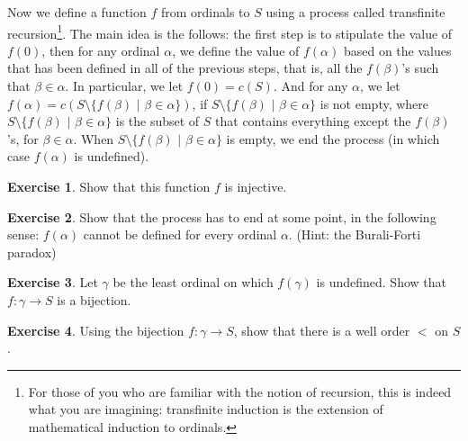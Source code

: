\documentclass[11pt]{article}
\theoremstyle{definition}
\newtheorem{exer}{Exercise}
\begin{document}
\noindent
Now we define a function $f$ from ordinals to $S$ using a process called transfinite recursion\footnote{For those of you who are familiar with the notion of recursion, this is indeed what you are imagining: transfinite induction is the extension of mathematical induction to ordinals.}. The main idea is the follows: the first step is to stipulate the value of $f(0)$, then for any ordinal $\alpha$, we define the value of $f(\alpha)$ based on the values that has been defined in all of the previous steps, that is, all the $f(\beta)$'s such that $\beta \in \alpha$. In particular, we let $f(0) = c(S)$. And for any $\alpha$, we let $f(\alpha) = c(S \setminus \{f(\beta) \, \, | \, \, \beta \in \alpha \})$, if $S \setminus \{f(\beta) \, \, | \, \, \beta \in \alpha \}$ is not empty, where $S \setminus \{f(\beta) \, \, | \, \, \beta \in \alpha \}$ is the subset of $S$ that contains everything except the $f(\beta)$'s, for $\beta \in \alpha$. When $S \setminus \{f(\beta) \, \, | \, \, \beta \in \alpha \}$ is empty, we end the process (in which case $f(\alpha)$ is undefined).

\begin{exer}
Show that this function $f$ is injective.
\end{exer}

\begin{exer}
Show that the process has to end at some point, in the following sense: $f(\alpha)$ cannot be defined for every ordinal $\alpha$. (Hint: the Burali-Forti paradox)
\end{exer}

\begin{exer}
Let $\gamma$ be the least ordinal on which $f(\gamma)$ is undefined. Show that $f: \gamma \rightarrow S$ is a bijection.
\end{exer}

\begin{exer}
Using the bijection $f: \gamma \rightarrow S$, show that there is a well order $<$ on $S$.
\end{exer}
\end{document}
